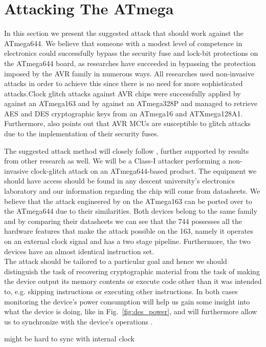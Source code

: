 \section{Attacking The ATmega}
\label{sec:attacking_mega}

In this section we present the suggested attack that should work against the ATmega644. We believe that someone with a modest level of competence in electronics could successfully bypass the security fuse and lock-bit protections on the ATmega644 board, as researches have succeeded in bypassing the protection imposed by the AVR family in numerous ways. All researches used non-invasive attacks in order to achieve this since there is no need for more sophisticated attacks.Clock glitch attacks against AVR chips were successfully applied by \citep{glitches_paper} against an ATmega163 and by \citep{chipwhisperer} against an ATmega328P and \citep{avr_mega} managed to retrieve AES and DES cryptographic keys from an ATmega16 and ATXmega128A1. Furthermore, \citep{sergei:thesis} also points out that AVR MCUs are susceptible to glitch attacks due to the implementation of their security fuses. 

The suggested attack method will closely follow \citep{glitches_paper}, further supported by results from other research as well. We will be a Class-I attacker performing a non-invasive clock-glitch attack on an ATmega644-based product. The equipment we should have access should be found in any descent university's electronics laboratory and our information regarding the chip will come from datasheets. We believe that the attack engineered by \citep{glitches_paper} on the ATmega163 can be ported over to the ATmega644 due to their similarities. Both devices belong to the same family and by comparing their datasheets we can see that the 744 possesses all the hardware features that make the attack possible on the 163, namely it operates on an external clock signal and has a two stage pipeline. Furthermore, the two devices have an almost identical instruction set.\\

The attack should be tailored to a particular goal and hence we should distinguish the task of recovering cryptographic material from the task of making the device output its memory contents or execute code other than it was intended to, e.g. skipping instructions or executing other instructions. In both cases monitoring the device's power consumption will help us gain some insight into what the device is doing, like in Fig.~\ref{fig:des_power}, and will furthermore allow us to synchronize with the device's operations \citep{sergei:thesis}\citep{avr_mega}. 



might be hard to sync with internal clock



